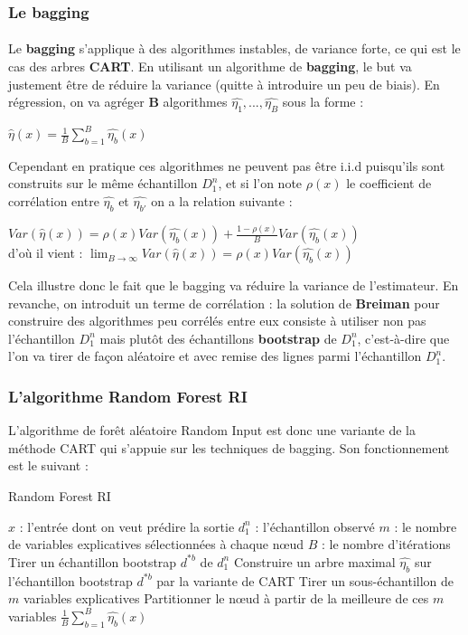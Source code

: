 \documentclass[14pt, openany]{article}
\begin{document}
\subsubsection{Le bagging}
\paragraph{}
Le \textbf{bagging} s'applique à des algorithmes instables, de variance forte, ce qui est le cas des arbres \textbf{CART}. En utilisant un algorithme de \textbf{bagging}, le but va justement être de réduire la variance (quitte à introduire un peu de biais).
En régression, on va agréger \textbf{B} algorithmes $\hat{\eta_1},...,\hat{\eta_B}$ sous la forme :
\begin{center}
$\hat{\eta}(x)=\frac{1}{B}\sum\limits_{b=1}^B \hat{\eta_b}(x)$
\end{center}
Cependant en pratique ces algorithmes ne peuvent pas être i.i.d puisqu'ils sont construits sur le même échantillon $D^{n}_{1}$, et si l'on note $\rho(x)$ le coefficient de corrélation entre $\hat{\eta_b}$ et $\hat{\eta_{b'}}$ on a la relation suivante :
\begin{center}
$Var(\hat{\eta}(x))=\rho(x)Var(\hat{\eta_b}(x))+\frac{1-\rho(x)}{B}Var(\hat{\eta_b}(x))$\\
\medskip
d'où il vient : $\lim_{B \to \infty} Var(\hat{\eta}(x)) = \rho(x)Var(\hat{\eta_b}(x))$
\end{center}
Cela illustre donc le fait que le bagging va réduire la variance de l'estimateur. En revanche, on introduit un terme de corrélation : la solution de \textbf{Breiman} pour construire des algorithmes peu corrélés entre eux consiste à utiliser non pas l'échantillon $D^{n}_{1}$ mais plutôt des échantillons \textbf{bootstrap} de $D^{n}_{1}$, c'est-à-dire que l'on va tirer de façon aléatoire et avec remise des lignes parmi l'échantillon $D^{n}_{1}$.
\subsubsection{L'algorithme Random Forest RI}
L'algorithme de forêt aléatoire Random Input est donc une variante de la méthode CART qui s'appuie sur les techniques de bagging. Son fonctionnement est le suivant :\\
\begin{algorithm}
\caption{Random Forest RI}
\begin{algorithmic}
\REQUIRE 
\STATE $x$ : l'entrée dont on veut prédire la sortie
\STATE $d^{n}_{1}$ : l'échantillon observé
\STATE $m$ : le nombre de variables explicatives sélectionnées à chaque nœud
\STATE $B$ : le nombre d'itérations
\ENSURE
{}
\STATE Tirer un échantillon bootstrap $d^{*b}$ de $d^{n}_{1}$
\STATE Construire un arbre maximal $\hat{\eta_b}$ sur l'échantillon bootstrap $d^{*b}$ par la variante de CART
\STATE Tirer un sous-échantillon de $m$ variables explicatives
\STATE Partitionner le nœud à partir de la \og meilleure \fg{} de ces $m$ variables
\ENDFOR
\ENDFOR
\RETURN $\frac{1}{B}\sum\limits_{b=1}^B \hat{\eta_b}(x)$
\PRINT
\end{algorithmic}
\end{algorithm}
\end{document}
